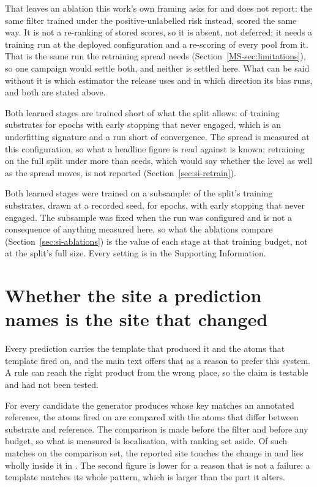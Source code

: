 \documentclass[journal=jcisd8,manuscript=suppinfo,layout=onecolumn]{achemso}
\begin{document}
That leaves an ablation this work's own framing asks for and does not report: the same filter
trained under the positive-unlabelled risk instead, scored the same way. It is not a re-ranking
of stored scores, so it is absent, not deferred; it needs a training run at the
deployed configuration and a re-scoring of every pool from it. That is the same run the
retraining spread needs (Section~\ref{MS-sec:limitations}), so one campaign would settle both,
and neither is settled here. What can be said without it is which estimator the release uses and
in which direction its bias runs, and both are stated above.


Both learned stages are trained short of what the split allows: \numTrainSubstrates{} of
\numSplitTrainSubstrates{} training substrates for \numTrainEpochsWord{} epochs with early stopping
that never engaged, which is an underfitting signature and a run short of convergence. The spread
is measured at this configuration, so what a headline figure is read against is known; retraining
on the full split under more than \numSpreadSeedsWord{} seeds, which would say whether the level as
well as the spread moves, is not reported (Section~\ref{sec:si-retrain}).

Both learned stages were trained on a subsample: \numTrainSubstrates{} of the split's
\numSplitTrainSubstrates{} training substrates, drawn at a recorded seed, for
\numTrainEpochsWord{} epochs, with early stopping that never engaged. The subsample was fixed when
the run was configured and is not a consequence of anything measured here, so what the ablations
compare (Section~\ref{sec:si-ablations}) is the value of each stage at that training budget,
not at the split's full size. Every setting is in the Supporting Information.
\section{Whether the site a prediction names is the site that changed}
\label{sec:si-site}

Every prediction carries the template that produced it and the atoms that template fired on, and
the main text offers that as a reason to prefer this system. A rule can reach the right product
from the wrong place, so the claim is testable and had not been tested.

For every candidate the generator produces whose key matches an annotated reference, the atoms
fired on are compared with the atoms that differ between substrate and reference. The comparison
is made before the filter and before any budget, so what is measured is localisation, with ranking
set aside. Of \numSiteScored{} such matches on the comparison set, the reported site touches the
change in \numSiteTouchingPct{} and lies wholly inside it in \numSiteInsidePct{}. The second
figure is lower for a reason that is not a failure: a template matches its whole pattern, which
is larger than the part it alters.
\end{document}
